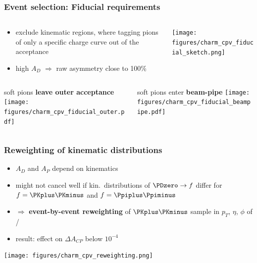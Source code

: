 \documentclass[18pt, aspectratio=169]{beamer}
\newcommand{\kitemph}[1]{\textcolor{kit-green100}{\bf{#1}}}
\newcommand{\PDstarplus}{\HepParticle{D}{}{*+}}
\begin{document}
\begin{frame}
  \frametitle{Event selection: Fiducial requirements}
  \begin{columns}
    \begin{column}{.65\textwidth}
        \begin{itemize}
        \item exclude kinematic regions, where tagging pions of only a specific charge curve out of the acceptance
        \item high $A_D$ $\Rightarrow$ raw asymmetry close to 100\%
        \end{itemize}
    \end{column}
    \begin{column}{.35\textwidth}
      \texttt{[image: figures/charm\_cpv\_fiducial\_sketch.png]}
    \end{column}
  \end{columns}

  \begin{columns}
    \begin{column}{.5\textwidth}
      \centering
      soft pions \textbf{leave outer acceptance}
      \texttt{[image: figures/charm\_cpv\_fiducial\_outer.pdf]}
    \end{column}
    \begin{column}{.5\textwidth}
      soft pions enter \textbf{beam-pipe}
      \texttt{[image: figures/charm\_cpv\_fiducial\_beampipe.pdf]}
    \end{column}
  \end{columns}
\end{frame}

\begin{frame}
  \frametitle{Reweighting of kinematic distributions}
  \begin{itemize}
  \item $A_D$ and $A_P$ depend on kinematics
  \item might not cancel well if kin.\ distributions of $\PDzero\rightarrow f$ differ for
    $f = \PKplus\PKminus$ and $f = \Ppiplus\Ppiminus$
  \item $\Rightarrow$ \kitemph{event-by-event reweighting} of $\PKplus\PKminus$ sample in $p_T$,
    $\eta$, $\phi$ of \PDstarplus / \PDzero
  \item result: effect on $\Delta A_{CP}$ below $10^{-4}$
  \end{itemize}
  \centering
  \texttt{[image: figures/charm\_cpv\_reweighting.png]}
\end{frame}
\end{document}
